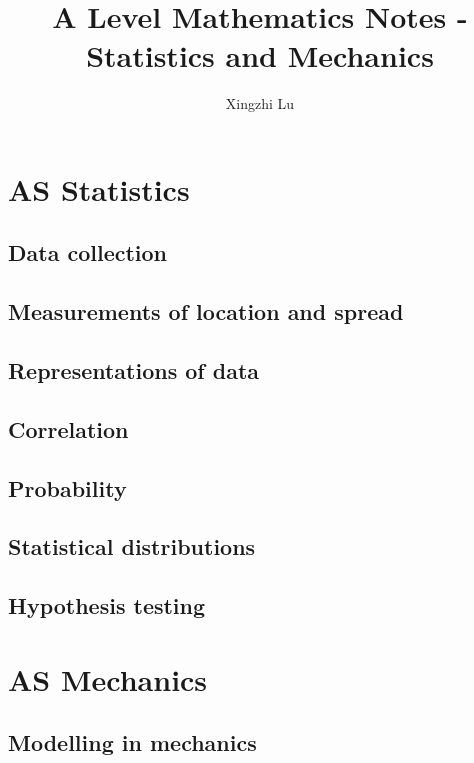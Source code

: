 \documentclass[oneside,fleqn,11pt]{book}
\title{A Level Mathematics Notes - Statistics and Mechanics}
\author{Xingzhi Lu}
\date{}
\begin{document}
\maketitle
\everymath{\displaystyle}

\tableofcontents

\part{AS Statistics}
\chapter{Data collection}


\chapter{Measurements of location and spread}


\chapter{Representations of data}


\chapter{Correlation}


\chapter{Probability}


\chapter{Statistical distributions}


\chapter{Hypothesis testing}


\part{AS Mechanics}
\setcounter{chapter}{7}
\chapter{Modelling in mechanics}

\end{document}
